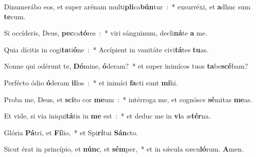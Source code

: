 \item Dinumerábo eos, et super arénam mul\-ti\-\textbf{pli}\-ca\-\textbf{bún}\-tur~:~* exsurréxi, et \textbf{a}\-dhuc sum \textbf{te}\-cum.
\item Si occíderis, Deus, \textbf{pec}\-ca\textbf{tó}\-res~:~* viri sánguinum, decli\textbf{ná}\-te \textbf{a} me.
\item Quia dícitis in cogi\textbf{ta}\-ti\textbf{ó}\-ne~:~* Accípient in vanitáte civi\textbf{tá}\-tes \textbf{tu}\-as.
\item Nonne qui odérunt te, \textbf{Dó}\-mine, \textbf{ó}\-deram?~* et super inimícos tuos \textbf{ta}\-be\textbf{scé}\-bam?
\item Perfécto ódio \textbf{ó}\-deram \textbf{il}\-los~:~* et inimíci \textbf{fa}\-cti sunt \textbf{mi}\-hi.
\item Proba me, Deus, et \textbf{sci}\-to cor \textbf{me}\-um~:~* intérroga me, et cognósce \textbf{sé}\-mitas \textbf{me}\-as.
\item Et vide, si via iniqui\textbf{tá}\-tis in \textbf{me} est~:~* et deduc me in \textbf{vi}\-a æ\textbf{tér}\-na.
\item Glória \textbf{Pá}\-tri, et \textbf{Fí}\-lio,~* et Spi\textbf{rí}\-tui \textbf{Sán}\-cto.
\item Sicut érat in princípio, et \textbf{núnc}, et \textbf{sém}\-per,~* et in sǽcula sæcu\textbf{ló}\-rum. \textbf{A}\-men.